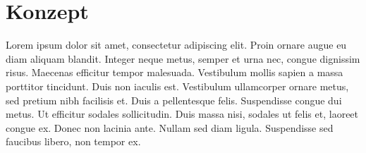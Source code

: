 
\chapter{Konzept}

Lorem ipsum dolor sit amet, consectetur adipiscing elit.
Proin ornare augue eu diam aliquam blandit.
Integer neque metus, semper et urna nec, congue dignissim risus.
Maecenas efficitur tempor malesuada.
Vestibulum mollis sapien a massa porttitor tincidunt.
Duis non iaculis est.
Vestibulum ullamcorper ornare metus, sed pretium nibh facilisis et.
Duis a pellentesque felis.
Suspendisse congue dui metus.
Ut efficitur sodales sollicitudin.
Duis massa nisi, sodales ut felis et, laoreet congue ex.
Donec non lacinia ante.
Nullam sed diam ligula.
Suspendisse sed faucibus libero, non tempor ex. 
